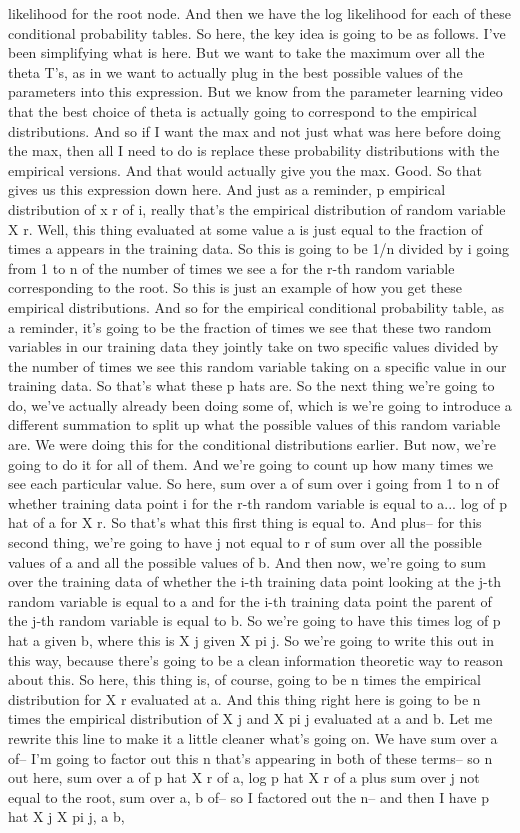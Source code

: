 likelihood for the root node. And then we have the log likelihood for each of these conditional probability tables. So here, the key idea is going to be as follows. I've been simplifying what is here. But we want to take the maximum over all the theta T's, as in we want to actually plug in the best possible values of the parameters into this expression. But we know from the parameter learning video that the best choice of theta is actually going to correspond to the empirical distributions. And so if I want the max and not just what was here before doing the max, then all I need to do is replace these probability distributions with the empirical versions. And that would actually give you the max. Good. So that gives us this expression down here. And just as a reminder, p empirical distribution of x r of i, really that's the empirical distribution of random variable X r. Well, this thing evaluated at some value a is just equal to the fraction of times a appears in the training data. So this is going to be 1/n divided by i going from 1 to n of the number of times we see a for the r-th random variable corresponding to the root. So this is just an example of how you get these empirical distributions. And so for the empirical conditional probability table, as a reminder, it's going to be the fraction of times we see that these two random variables in our training data they jointly take on two specific values divided by the number of times we see this random variable taking on a specific value in our training data. So that's what these p hats are. So the next thing we're going to do, we've actually already been doing some of, which is we're going to introduce a different summation to split up what the possible values of this random variable are. We were doing this for the conditional distributions earlier. But now, we're going to do it for all of them. And we're going to count up how many times we see each particular value. So here, sum over a of sum over i going from 1 to n of whether training data point i for the r-th random variable is equal to a... log of p hat of a for X r. So that's what this first thing is equal to. And plus-- for this second thing, we're going to have j not equal to r of sum over all the possible values of a and all the possible values of b. And then now, we're going to sum over the training data of whether the i-th training data point looking at the j-th random variable is equal to a and for the i-th training data point the parent of the j-th random variable is equal to b. So we're going to have this times log of p hat a given b, where this is X j given X pi j. So we're going to write this out in this way, because there's going to be a clean information theoretic way to reason about this. So here, this thing is, of course, going to be n times the empirical distribution for X r evaluated at a. And this thing right here is going to be n times the empirical distribution of X j and X pi j evaluated at a and b. Let me rewrite this line to make it a little cleaner what's going on. We have sum over a of-- I'm going to factor out this n that's appearing in both of these terms-- so n out here, sum over a of p hat X r of a, log p hat X r of a plus sum over j not equal to the root, sum over a, b of-- so I factored out the n-- and then I have p hat X j X pi j, a b, 